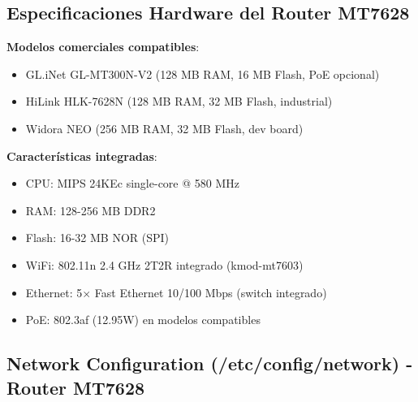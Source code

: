 \subsection{Especificaciones Hardware del Router MT7628}

\textbf{Modelos comerciales compatibles}:
\begin{itemize}
    \item GL.iNet GL-MT300N-V2 (128 MB RAM, 16 MB Flash, PoE opcional)
    \item HiLink HLK-7628N (128 MB RAM, 32 MB Flash, industrial)
    \item Widora NEO (256 MB RAM, 32 MB Flash, dev board)
\end{itemize}

\textbf{Características integradas}:
\begin{itemize}
    \item CPU: MIPS 24KEc single-core @ 580 MHz
    \item RAM: 128-256 MB DDR2
    \item Flash: 16-32 MB NOR (SPI)
    \item WiFi: 802.11n 2.4 GHz 2T2R integrado (kmod-mt7603)
    \item Ethernet: 5$\times$ Fast Ethernet 10/100 Mbps (switch integrado)
    \item PoE: 802.3af (12.95W) en modelos compatibles
\end{itemize}

\subsection{Network Configuration (/etc/config/network) - Router MT7628}

